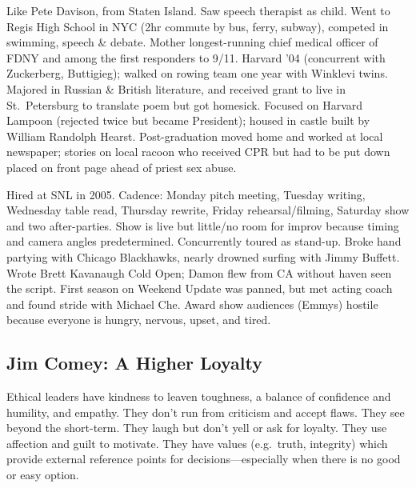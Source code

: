 \documentclass[
]{article}
\begin{document}
Like Pete Davison, from Staten Island. Saw speech therapist as child.
Went to Regis High School in NYC (2hr commute by bus, ferry, subway),
competed in swimming, speech \& debate. Mother longest-running chief
medical officer of FDNY and among the first responders to 9/11. Harvard
'04 (concurrent with Zuckerberg, Buttigieg); walked on rowing team one
year with Winklevi twins. Majored in Russian \& British literature, and
received grant to live in St.~Petersburg to translate poem but got
homesick. Focused on Harvard Lampoon (rejected twice but became
President); housed in castle built by William Randolph Hearst.
Post-graduation moved home and worked at local newspaper; stories on
local racoon who received CPR but had to be put down placed on front
page ahead of priest sex abuse.

Hired at SNL in 2005. Cadence: Monday pitch meeting, Tuesday writing,
Wednesday table read, Thursday rewrite, Friday rehearsal/filming,
Saturday show and two after-parties. Show is live but little/no room for
improv because timing and camera angles predetermined. Concurrently
toured as stand-up. Broke hand partying with Chicago Blackhawks, nearly
drowned surfing with Jimmy Buffett. Wrote Brett Kavanaugh Cold Open;
Damon flew from CA without haven seen the script. First season on
Weekend Update was panned, but met acting coach and found stride with
Michael Che. Award show audiences (Emmys) hostile because everyone is
hungry, nervous, upset, and tired.

\hypertarget{jim-comey-a-higher-loyalty}{%
\subsection{Jim Comey: A Higher
Loyalty}\label{jim-comey-a-higher-loyalty}}

Ethical leaders have kindness to leaven toughness, a balance of
confidence and humility, and empathy. They don't run from criticism and
accept flaws. They see beyond the short-term. They laugh but don't yell
or ask for loyalty. They use affection and guilt to motivate. They have
values (e.g.~truth, integrity) which provide external reference points
for decisions---especially when there is no good or easy option.
\end{document}
